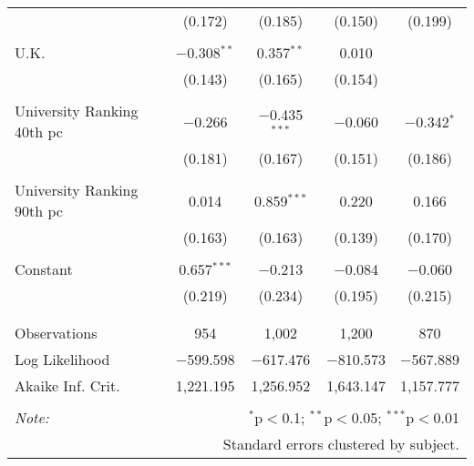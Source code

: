 \begin{table}[!htbp]
\begin{tabular}{@{\extracolsep{5pt}}lcccc}
  & (0.172) & (0.185) & (0.150) & (0.199) \\ 
  & & & & \\ 
 U.K. & $-$0.308$^{**}$ & 0.357$^{**}$ & 0.010 &  \\ 
  & (0.143) & (0.165) & (0.154) &  \\ 
  & & & & \\ 
 University Ranking 40th pc & $-$0.266 & $-$0.435$^{***}$ & $-$0.060 & $-$0.342$^{*}$ \\ 
  & (0.181) & (0.167) & (0.151) & (0.186) \\ 
  & & & & \\ 
 University Ranking 90th pc & 0.014 & 0.859$^{***}$ & 0.220 & 0.166 \\ 
  & (0.163) & (0.163) & (0.139) & (0.170) \\ 
  & & & & \\ 
 Constant & 0.657$^{***}$ & $-$0.213 & $-$0.084 & $-$0.060 \\ 
  & (0.219) & (0.234) & (0.195) & (0.215) \\ 
  & & & & \\ 
\hline \\[-1.8ex] 
Observations & 954 & 1,002 & 1,200 & 870 \\ 
Log Likelihood & $-$599.598 & $-$617.476 & $-$810.573 & $-$567.889 \\ 
Akaike Inf. Crit. & 1,221.195 & 1,256.952 & 1,643.147 & 1,157.777 \\ 
\hline 
\hline \\[-1.8ex] 
\textit{Note:}  & \multicolumn{4}{r}{$^{*}$p$<$0.1; $^{**}$p$<$0.05; $^{***}$p$<$0.01} \\ 
 & \multicolumn{4}{r}{Standard errors clustered by subject.} \\ 
\end{tabular} 
\end{table} 
